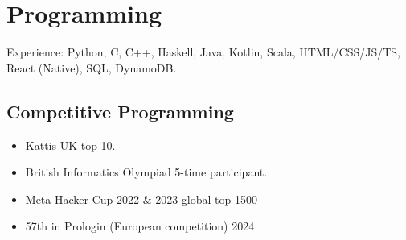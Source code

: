 \documentclass{Resume}
\begin{document}
   			


		\newpage
	\section{Programming}
		Experience: Python, C, C++, Haskell, Java, Kotlin, Scala, HTML/CSS/JS/TS, React (Native), SQL, DynamoDB.
   
		\subsection{Competitive Programming}
			\begin{itemize}
    			    \item \href{https://open.kattis.com/countries/GBR}{Kattis} UK top 10.
    			    \item British Informatics Olympiad 5-time participant.
    			    \item Meta Hacker Cup 2022 \& 2023 global top 1500
                    \item 57th in Prologin (European competition) 2024 
			\end{itemize}
\end{document}
